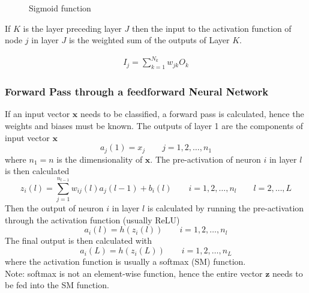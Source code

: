 \begin{figure}[htp]
\centering

\caption{Sigmoid function}
\label{fig:sigmoid}
\end{figure}

If $K$ is the layer preceding layer $J$ then the input to the activation function of node $j$ in layer $J$ is the weighted sum of the outputs of Layer $K$.

\begin{align*}
I_j = \sum_{k=1}^{N_k}w_{jk}O_k
\end{align*}

\subsubsection{Forward Pass through a feedforward Neural Network}
If an input vector $\mathbf{x}$ needs to be classified, a forward pass is calculated, hence the weights and biases must be known.
The outputs of layer 1 are the components of input vector $\mathbf{x}$
\[
  a_j(1)=x_j \qquad j = 1,2,\ldots,n_1
\]
where $n_1 = n$ is the dimensionality of $\mathbf{x}$.
The pre-activation of neuron $i$ in layer $l$ is then calculated
\[
  z_i(l) = \sum_{j=1}^{n_{l-1}} w_{ij}(l)a_j(l-1) + b_i(l) \qquad i=1,2,\ldots,n_l \qquad l=2,\ldots,L
\]
Then the output of neuron $i$ in layer $l$ is calculated by running the pre-activation through the activation function (usually ReLU)
\[
  a_i(l) = h(z_i(l)) \qquad i=1,2,\ldots,n_l
\]
The final output is then calculated with
\[
 a_i(L) = h(z_i(L)) \qquad i=1,2,\ldots,n_L
\]
where the activation function is usually a softmax (SM) function.\\
Note: softmax is not an element-wise function, hence the entire vector $\mathbf{z}$ needs to be fed into the SM function.

